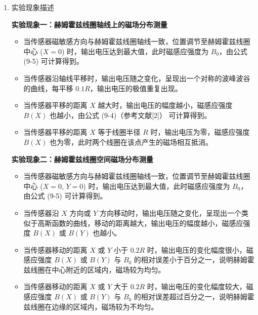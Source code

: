 \documentclass[dvipsnames, svgnames,a4paper,11pt]{article}
\begin{document}
\begin{enumerate}
		\item 实验现象描述
		
		\textbf{实验现象一：赫姆霍兹线圈轴线上的磁场分布测量}
		\begin{itemize}
			\item 当传感器磁敏感方向与赫姆霍兹线圈轴线一致，位置调节至赫姆霍兹线圈中心 ($X=0$) 时，输出电压达到最大值，此时磁感应强度为 $B_0$，由公式 (9-5) 可计算得到。
			\item 当传感器沿轴线平移时，输出电压随之变化，呈现出一个对称的波峰波谷的曲线，每平移 $0.1R$，输出电压的极值重复出现。
			\item 当传感器平移的距离 $X$ 越大时，输出电压的幅度越小，磁感应强度 $B(X)$ 也越小，由公式 (9-4)（参考文献[2]） 可计算得到。
			\item 当传感器平移的距离 $X$ 等于线圈半径 $R$ 时，输出电压为零，磁感应强度 $B(X)$ 也为零，此时两个线圈在该点产生的磁场相互抵消。
		\end{itemize}
		
		\textbf{实验现象二：赫姆霍兹线圈空间磁场分布测量}
		\begin{itemize}
			\item 当传感器磁敏感方向与赫姆霍兹线圈轴线一致，位置调节至赫姆霍兹线圈中心 ($X=0$, $Y=0$) 时，输出电压达到最大值，此时磁感应强度为 $B_0$，由公式 (9-5) 可计算得到。
			\item 当传感器沿 $X$ 方向或 $Y$ 方向移动时，输出电压随之变化，呈现出一个类似于高斯函数的曲线，移动的距离越大，输出电压的幅度越小，磁感应强度 $B(X)$ 或 $B(Y)$ 也越小。
			\item 当传感器移动的距离 $X$ 或 $Y$ 小于 $0.2R$ 时，输出电压的变化幅度很小，磁感应强度 $B(X)$ 或 $B(Y)$ 与 $B_0$ 的相对误差小于百分之一，说明赫姆霍兹线圈在中心附近的区域内，磁场较为均匀。
			\item 当传感器移动的距离 $X$ 或 $Y$ 大于 $0.2R$ 时，输出电压的变化幅度较大，磁感应强度 $B(X)$ 或 $B(Y)$ 与 $B_0$ 的相对误差超过百分之一，说明赫姆霍兹线圈在边缘的区域内，磁场较为不均匀。
		\end{itemize}
		
	\end{enumerate}
	
\end{document}
